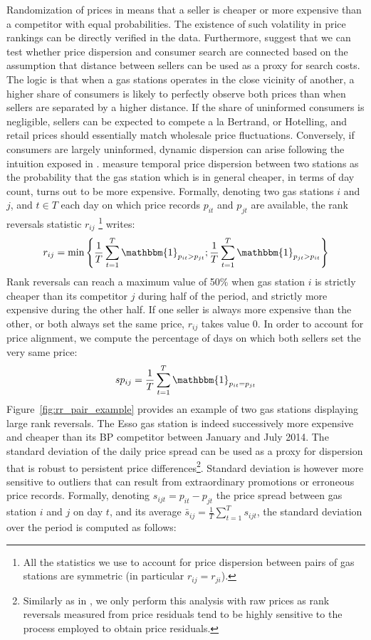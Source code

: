 \documentclass[english]{article}
\begin{document}
Randomization of prices in \cite{VAR80} means that a seller is cheaper or more expensive than a competitor with equal probabilities. The existence of such volatility in price rankings can be directly verified in the data. Furthermore, \cite{CHA11} suggest that we can test whether price dispersion and consumer search are connected based on the assumption that distance between sellers can be used as a proxy for search costs. The logic is that when a gas stations operates in the close vicinity of another, a higher share of consumers is likely to perfectly observe both prices than when sellers are separated by a higher distance. If the share of uninformed consumers is negligible, sellers can be expected to compete a la Bertrand, or Hotelling, and retail prices should essentially match wholesale price fluctuations. Conversely, if consumers are largely uninformed, dynamic dispersion can arise following the intuition exposed in \cite{VAR80}. \cite{CHA11} measure temporal price dispersion between two stations as the probability that the gas station which is in general cheaper, in terms of day count, turns out to be more expensive. Formally, denoting two gas stations $i$ and $j$, and $t \in T$ each day on which price records $p_{it}$ and $p_{jt}$ are available, the rank reversals statistic $r_{ij}$%
\footnote{All the statistics we use to account for price dispersion between pairs of gas stations are symmetric (in particular $r_{ij} = r_{ji}$).}%
writes:
\begin{align*}
r_{ij} = \min\left\{\frac{1}{T} \sum_{t=1}^{T} \mathbbm{1}_{p_{it} > p_{jt}}; \frac{1}{T} \sum_{t=1}^{T} \mathbbm{1}_{p_{jt} > p_{it}}\right\}
\end{align*}
Rank reversals can reach a maximum value of 50\% when gas station $i$ is strictly cheaper than its competitor $j$ during half of the period, and strictly more expensive during the other half. If one seller is always more expensive than the other, or both always set the same price, $r_{ij}$ takes value 0. In order to account for price alignment, we compute the percentage of days on which both sellers set the very same price:
\begin{align*}
sp_{ij} = \frac{1}{T} \sum_{t=1}^{T} \mathbbm{1}_{p_{it} = p_{jt}}
\end{align*}
Figure~\ref{fig:rr_pair_example} provides an example of two gas stations displaying large rank reversals. The Esso gas station is indeed successively more expensive and cheaper than its BP competitor between January and July 2014. The standard deviation of the daily price spread can be used as a proxy for dispersion that is robust to persistent price differences\footnote{Similarly as in \cite{CHA11}, we only perform this analysis with raw prices as rank reversals measured from price residuals tend to be highly sensitive to the process employed to obtain price residuals.}. Standard deviation is however more sensitive to outliers that can result from extraordinary promotions or erroneous price records. Formally, denoting $s_{ijt} = p_{it} - p_{jt}$ the price spread between gas station $i$ and $j$ on day $t$, and its average $\bar{s}_{ij} = \frac{1}{T} \sum_{t=1}^{T} s_{ijt}$, the standard deviation over the period is computed as follows:
\end{document}

